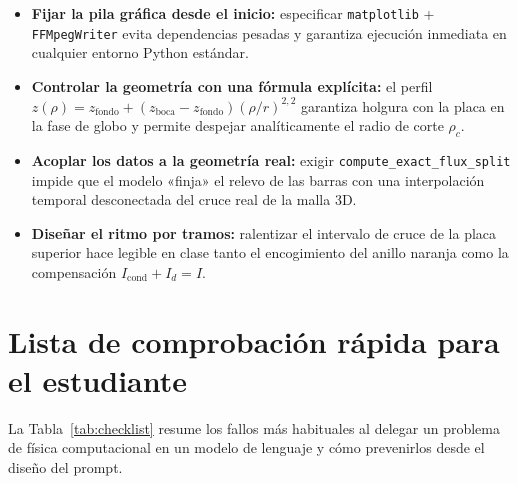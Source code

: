 \documentclass[11pt]{article}
\begin{document}
\begin{itemize}
    \item \textbf{Fijar la pila gráfica desde el inicio:} especificar \texttt{matplotlib} + \texttt{FFMpegWriter} evita dependencias pesadas y garantiza ejecución inmediata en cualquier entorno Python estándar.
    \item \textbf{Controlar la geometría con una fórmula explícita:} el perfil $z(\rho) = z_{\mathrm{fondo}} + (z_{\mathrm{boca}} - z_{\mathrm{fondo}})(\rho/r)^{2{,}2}$ garantiza holgura con la placa en la fase de globo y permite despejar analíticamente el radio de corte $\rho_c$.
    \item \textbf{Acoplar los datos a la geometría real:} exigir \texttt{compute\_exact\_flux\_split} impide que el modelo «finja» el relevo de las barras con una interpolación temporal desconectada del cruce real de la malla 3D.
    \item \textbf{Diseñar el ritmo por tramos:} ralentizar el intervalo de cruce de la placa superior hace legible en clase tanto el encogimiento del anillo naranja como la compensación $I_{\mathrm{cond}} + I_d = I$.
\end{itemize}

\section{Lista de comprobación rápida para el estudiante}

La Tabla~\ref{tab:checklist} resume los fallos más habituales al delegar un problema de física computacional en un modelo de lenguaje y cómo prevenirlos desde el diseño del prompt.
\end{document}
